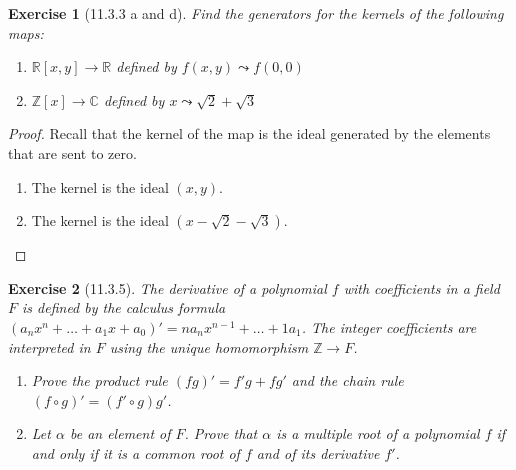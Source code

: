 \documentclass[12pt]{article}
\newtheorem*{exer}{Exercise}
\begin{document}

\begin{exer}[11.3.3 a and d]

    Find the generators for the kernels of the following maps:

    \begin{enumerate}
        \item $\mathbb{R}[x, y] \rightarrow \mathbb{R}$ defined by $f(x,
            y) \leadsto f(0, 0)$

        \item $\mathbb{Z}[x] \rightarrow \mathbb{C}$ defined by $x
            \leadsto \sqrt{2} + \sqrt{3}$

    \end{enumerate}
\end{exer}

\begin{proof}

    Recall that the kernel of the map is the ideal generated by the
    elements that are sent to zero.

    \begin{enumerate}
        \item The kernel is the ideal $(x, y)$.
        \item The kernel is the ideal $(x -\sqrt{2} - \sqrt{3})$.
    \end{enumerate}
\end{proof}


\begin{exer}[11.3.5]

    The derivative of a polynomial $f$ with coefficients in a field $F$
    is defined by the calculus formula $(a_n x^n + \dots + a_1 x + a_0)'
    = n a_n x^{n-1} + \dots + 1 a_1$. The integer coefficients are
    interpreted in $F$ using the unique homomorphism $\mathbb{Z}
    \rightarrow F$.

    \begin{enumerate}
        \item Prove the product rule $(fg)' = f'g + fg'$ and the chain
            rule $(f \circ g)' = (f' \circ g)g'$.

        \item Let $\alpha$ be an element of $F$. Prove that $\alpha$ is
            a multiple root of a polynomial $f$ if and only if it is a
            common root of $f$ and of its derivative $f'$.

    \end{enumerate}
\end{exer}
\end{document}
